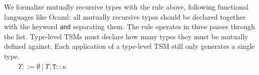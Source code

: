 \documentclass{sig-alternate}[10pt]
\newcommand{\flyingbox}[1]{\fbox{{#1}}}
\newcommand{\T}{\mathtt{T}}
\begin{document}
%

\begin{center}
\DP
\end{center}

We formalize mutually recursive types with the rule above, following functional languages like Ocaml: all mutually recursive types should be declared together with the keyword \verb|and| separating them. The rule operates in three passes through the list. Type-level TSMs must declare how many types they must be mutually defined against. Each application of a type-level TSM still only generates a single type. \\

\flyingbox{$\vdash_{\Theta}^\Psi \theta \sim \Upsilon$}~~~~$\Upsilon ::= \emptyset ~|~ \Upsilon, \mathtt{T} :: \kappa$\\
\end{document}
